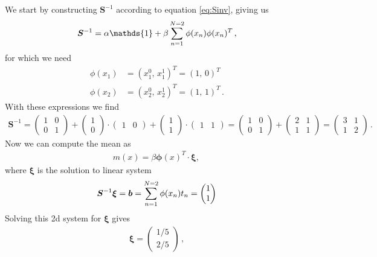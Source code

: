 \documentclass[11pt, DINA4, fleqn]{amsart}
\begin{document}
We start by constructing $\bm{S}^{-1}$ according to equation \eqref{eq:Sinv}, giving us
\begin{align}
\bm{S}^{-1} = \alpha \mathds{1} + \beta \sum\displaylimits_{n=1}^{N=2} \phi(x_n)\phi(x_n)^T \, , 
\end{align}
for which we need
\begin{align}
\phi(x_1) &= (x_1^0, \, x_1^1)^T = (1, \, 0)^T \\
\phi(x_2) &= (x_2^0, \, x_2^1)^T = (1, \, 1)^T \, .
\end{align}
With these expressions we find
\begin{align}
\bm{S}^{-1} = \begin{pmatrix}
1 & 0 \\
0 & 1
\end{pmatrix} + 
\begin{pmatrix}
1 \\ 0
\end{pmatrix} 
\cdot 
\begin{pmatrix}
1 & 0
\end{pmatrix}
+
\begin{pmatrix}
1 \\ 1
\end{pmatrix} 
\cdot 
\begin{pmatrix}
1 & 1
\end{pmatrix} = 
\begin{pmatrix}
1 & 0 \\
0 & 1
\end{pmatrix} +
\begin{pmatrix}
2 & 1 \\
1 & 1
\end{pmatrix} =
\begin{pmatrix}
3 & 1 \\
1 & 2
\end{pmatrix} \, .
\end{align}
Now we can compute the mean as
\begin{align}
m(x) = \beta\bm{\phi}(x)^T \cdot \bm{\xi} , \,
\end{align}
where $\bm{\xi}$ is the solution to linear system
\begin{align}
\bm{S}^{-1} \bm{\xi} = \bm{b} = \sum\displaylimits_{n=1}^{N=2}\phi(x_n) t_n = \begin{pmatrix}
1 \\ 1
\end{pmatrix}
\end{align}
Solving this 2d system for $\bm{\xi}$ gives
\begin{align}
\bm{\xi} = \begin{pmatrix}
1/5 \\ 2/5
\end{pmatrix}\, ,
\end{align}
\end{document}
